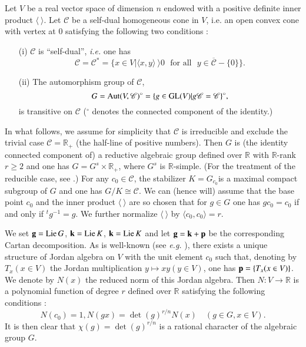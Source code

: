 \section{}\label{art11-sec1}
Let $V$ be a real vector space of dimension $n$ endowed with a positive definite inner product $\langle \ \rangle$. Let $\mathscr{C}$ be a self-dual homogeneous cone in $V$, i.e. an open convex cone with vertex at 0 satisfying the following two conditions : 
\begin{itemize}
\item[(i)] $\mathscr{C}$ is ``self-dual'', {\em i.e.} one has
$$
\mathscr{C}=\mathscr{C}^{*}=\{x\in V|\langle x,y\rangle \ \rangle 0\text{~ for all~ }y\in \overline{\mathscr{C}}-\{0\}\}.
$$

\item[(ii)] The automorphism group of $\mathscr{C}$,
$$
G=\operatorname{Aut}(V,\mathscr{C})^{\circ}=\{g\in \operatorname{GL}(V)|g\mathscr{C}=\mathscr{C}\}^{\circ},
$$
is transitive on $\mathscr{C}$ ($^{\circ}$ denotes the connected component of the identity.)
\end{itemize}
In what follows, we assume for simplicity that $\mathscr{C}$ is irreducible and exclude the trivial case $\mathscr{C}=\mathbb{R}_{+}$ (the half-line of positive numbers). Then $G$ is (the identity connected component of) a reductive algebraic group defined over $\mathbb{R}$ with $\mathbb{R}$-rank $r\geq 2$ and one has $G=G^{s}\times \mathbb{R}_{+}$, where $G^{s}$ is $\mathbb{R}$-simple. (For the treatment of the reducible case, see \cite{art11-keySO}.) For any $c_{0}\in \mathscr{C}$, the stabilizer $K=G_{c_{0}}$\pageoriginale is a maximal compact subgroup of $G$ and one has $G/K\cong \mathscr{C}$. We can (hence will) assume that the base point $c_{0}$ and the inner product $\langle \ \rangle$ are so chosen that for $g\in G$ one has $gc_{0}=c_{0}$ if and only if ${}^{t}g^{-1}=g$. We further normalize $\langle \ \rangle$ by $\langle c_{0},c_{0}\rangle=r$.

We set $\mathbf{g}=\operatorname{Lie} G$, $\mathbf{k}=\operatorname{Lie} K$, $\mathbf{k}=\operatorname{Lie} K$ and let $\mathbf{g}=\mathbf{k}+\mathbf{p}$ be the corresponding Cartan decomposition. As is well-known (see {\em e.g.} \cite{art11-keyS1}), there exists a unique structure of Jordan algebra on $V$ with the unit element $c_{0}$ such that, denoting by $T_{x}(x\in V)$ the Jordan multiplication $y\mapsto xy(y\in V)$, one has $\mathbf{p}=\{T_{x}(x\in V)\}$. We denote by $N(x)$ the reduced norm of this Jordan algebra. Then $N:V\to \mathbb{R}$ is a polynomial function of degree $r$ defined over $\mathbb{R}$ satisfying the following conditions :
\begin{equation}
N(c_{0})=1, N(gx)=\det(g)^{r/n}N(x)\quad (g\in G, x\in V).\label{art11-eq2}
\end{equation}
It is then clear that $\chi(g)=\det(g)^{r/n}$ is a rational character of the algebraic group $G$.

